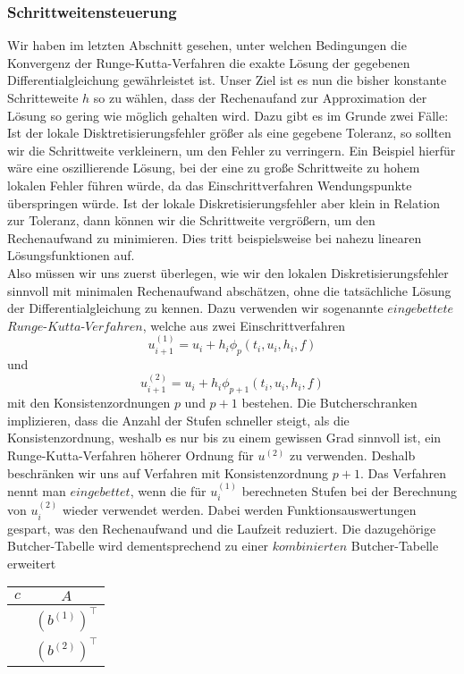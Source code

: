 \subsubsection{Schrittweitensteuerung}
Wir haben im letzten Abschnitt gesehen, unter welchen Bedingungen die Konvergenz der Runge-Kutta-Verfahren die exakte
Lösung der gegebenen Differentialgleichung gewährleistet ist. Unser Ziel ist es nun die bisher konstante Schritteweite
$h$ so zu wählen, dass der Rechenaufand zur Approximation der Lösung so gering wie möglich gehalten wird.
Dazu gibt es im Grunde zwei Fälle:\\
Ist der lokale Disktretisierungsfehler größer als eine gegebene Toleranz, so sollten wir die Schrittweite verkleinern,
um den Fehler zu verringern. Ein Beispiel hierfür wäre eine oszillierende Lösung, bei der eine zu große Schrittweite
zu hohem lokalen Fehler führen würde, da das Einschrittverfahren Wendungspunkte überspringen würde.
Ist der lokale Diskretisierungsfehler aber klein in Relation zur Toleranz, dann können wir die Schrittweite
vergrößern, um den Rechenaufwand zu minimieren. Dies tritt beispielsweise bei nahezu linearen Lösungsfunktionen auf. \\
Also müssen wir uns zuerst überlegen, wie wir den lokalen Diskretisierungsfehler sinnvoll mit minimalen Rechenaufwand
abschätzen, ohne die tatsächliche Lösung der Differentialgleichung zu kennen. Dazu verwenden wir sogenannte
$eingebettete$ $Runge$-$Kutta$-$Verfahren$, welche aus zwei Einschrittverfahren
\[
    u_{i+1}^{(1)} = u_i + h_i \phi_{p}(t_i,u_i,h_i,f)
\]
und
\[
    u_{i+1}^{(2)} = u_i + h_i \phi_{p+1}(t_i,u_i,h_i,f)
\]
mit den Konsistenzordnungen $p$ und $p+1$ bestehen. Die Butcherschranken implizieren, dass die Anzahl
der Stufen schneller steigt, als die Konsistenzordnung, weshalb es nur bis zu einem gewissen Grad sinnvoll ist, ein
Runge-Kutta-Verfahren höherer Ordnung für $u^{(2)}$ zu verwenden. Deshalb beschränken wir uns auf Verfahren mit
Konsistenzordnung $p+1$.
Das Verfahren nennt man $eingebettet$, wenn die für $u_i^{(1)}$ berechneten Stufen bei der Berechnung von $u_i^{(2)}$
wieder verwendet werden. Dabei werden Funktionsauswertungen gespart, was den Rechenaufwand und die Laufzeit reduziert.
Die dazugehörige Butcher-Tabelle wird dementsprechend zu einer $kombinierten$ Butcher-Tabelle erweitert
\begin{center}
    \begin{tabular}{c | c}
        $c$ & $A$ \\
        \hline
        & $(b^{(1)})^{\intercal}$ \\
        \hline
        & $(b^{(2)})^{\intercal}$
    \end{tabular}
\end{center}
